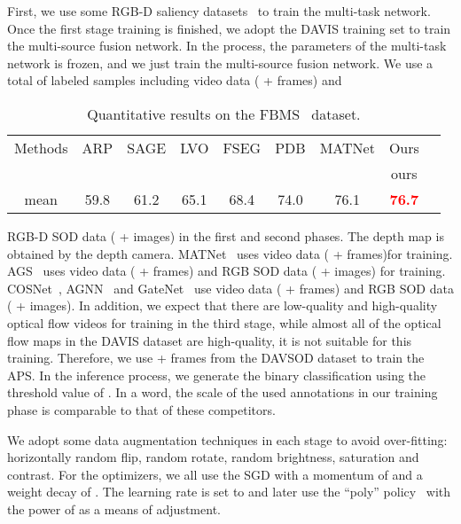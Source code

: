 \documentclass[sigconf]{acmart}
\newcommand{\textBC}[2]{\textbf{\textcolor{#1}{#2}}}
\begin{document}
First, we use some RGB-D saliency datasets~\cite{early_fusion_1,NJU2000,SIP,RGBD135,STERE,DMRA} to train the multi-task network. Once the first stage training is finished, we adopt the DAVIS training set to train the multi-source fusion network. In the process, the parameters of the multi-task network is frozen, and we just train the multi-source fusion network. 
We use a total of  labeled samples including video data ( + frames) and 
\begin{table}[t]
	\small
	\centering
	\setlength{\tabcolsep}{0.3em}	
	 \setlength{\abovecaptionskip}{3pt}
	\caption{Quantitative results on the FBMS~\cite{FBMS} dataset.}
\begin{tabular}{c||cccccccc}
	\hline
	Methods	& ARP& SAGE & LVO& FSEG & PDB & MATNet&Ours\\ 
	&~\cite{ARP}&~\cite{SAGE}&~\cite{LVO}&~\cite{FSEG}&~\cite{PDB}&~\cite{MATNet}&ours\\\hline
	mean  & 59.8 & 61.2& 65.1& 68.4& 74.0& 76.1&\textBC{red}{76.7}\\
	\hline
	\end{tabular}
	\vspace{-5mm}
	\label{table:Table3}	
\end{table}
RGB-D SOD data ( + images) in the first and second phases. The depth map is obtained by the depth camera. MATNet~\cite{MATNet} uses video data ( + frames)for training. AGS~\cite{AGS} uses video data ( + frames) and RGB SOD data ( + images) for training. COSNet~\cite{COSNet}, AGNN~\cite{AGNN} and GateNet~\cite{GateNet} use video data ( + frames) and RGB SOD data ( + images). In addition, we expect that there are low-quality and high-quality optical flow videos for training in the third stage, while almost all of the optical flow maps in the DAVIS dataset are high-quality, it is not suitable for this training. Therefore, we use  + frames from the DAVSOD dataset to train the APS. In the inference process, we generate the binary classification using the threshold value of . In a word, the scale of the used annotations in our training phase is comparable to that of these competitors. 

We adopt some data augmentation techniques in each stage to avoid over-fitting: horizontally random flip, random rotate, random brightness, saturation and contrast. For the optimizers, we all use the SGD with a momentum of  and a weight decay of . The learning rate is set to  and later use the ``poly'' policy~\cite{poly} with the power of  as a means of adjustment.
\end{document}
